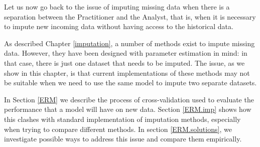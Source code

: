 Let us now go back to the issue of imputing missing data when there is a separation between the Practitioner and the Analyst, that is, when it is necessary to impute new incoming data without having access to the historical data.

As described Chapter \ref{imputation}, a number of methods exist to impute missing data. However, they have been designed with parameter estimation in mind: in that case, there is just one dataset that needs to be imputed. The issue, as we show in this chapter, is that current implementations of these methods may not be suitable when we need to use the same model to impute two separate datasets.

In Section \ref{ERM} we describe the process of cross-validation used to evaluate the performance that a model will have on new data. Section \ref{ERM.imp} shows how this clashes with standard implementation of imputation methods, especially when trying to compare different methods. In section \ref{ERM.solutions}, we investigate possible ways to address this issue and compare them empirically.




